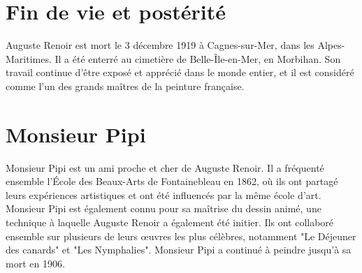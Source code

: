 \documentclass[12pt, a4paper]{article}
\begin{document}
   \section*{Fin de vie et postérité}
   \noindent
   Auguste Renoir est mort le 3 décembre 1919 à Cagnes-sur-Mer, dans les Alpes-Maritimes. Il a été enterré au cimetière de Belle-Île-en-Mer, en Morbihan. Son travail continue d'être exposé et apprécié dans le monde entier, et il est considéré comme l'un des grands maîtres de la peinture française.

\section*{Monsieur Pipi}
   \noindent
   Monsieur Pipi est un ami proche et cher de Auguste Renoir. Il a fréquenté ensemble l'École des Beaux-Arts de Fontainebleau en 1862, où ils ont partagé leurs expériences artistiques et ont été influencés par la même école d'art. Monsieur Pipi est également connu pour sa maîtrise du dessin animé, une technique à laquelle Auguste Renoir a également été initier. Ils ont collaboré ensemble sur plusieurs de leurs œuvres les plus célèbres, notamment "Le Déjeuner des canards" et "Les Nymphalies". Monsieur Pipi a continué à peindre jusqu'à sa mort en 1906.

   
\end{document}
